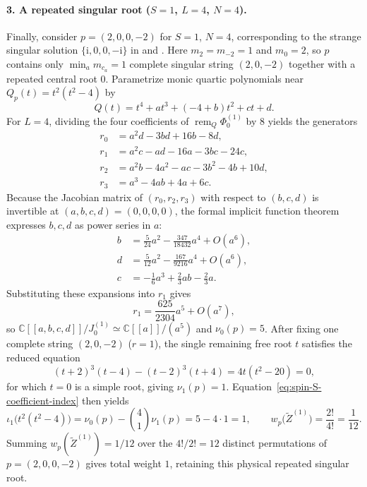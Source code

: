 \documentclass[11pt]{article}
\theoremstyle{definition}
\newcommand{\ii}{\mathrm{i}}
\newcommand{\C}{\mathbb{C}}
\begin{document}
\paragraph{3. A repeated singular root ($S=1$, $L=4$, $N=4$).}
Finally, consider $p=(2,0,0,-2)$ for $S=1$, $N=4$, corresponding to the strange singular solution
$\{\ii,0,0,-\ii\}$ in \cite[Section~B.2.1 and Table~2]{HNS2014} and \cite[Section~4.1, Example~3]{HJJ2024}. Here $m_2=m_{-2}=1$ and $m_0=2$, so $p$ contains only $\min_a m_{c_a}=1$ complete singular string $(2,0,-2)$ together with a repeated central root $0$. Parametrize monic quartic polynomials near $Q_p(t)=t^2(t^2-4)$ by
\[
 Q(t)=t^4+a t^3+(-4+b)t^2+ct+d.
\]
For $L=4$, dividing the four coefficients of $\operatorname{rem}_Q\Phi_0^{(1)}$ by $8$ yields the generators
\[
 \begin{aligned}
 r_0&=a^2d-3bd+16b-8d,\\
 r_1&=a^2c-ad-16a-3bc-24c,\\
 r_2&=a^2b-4a^2-ac-3b^2-4b+10d,\\
 r_3&=a^3-4ab+4a+6c.
 \end{aligned}
\]
Because the Jacobian matrix of $(r_0,r_2,r_3)$ with respect to $(b,c,d)$ is invertible
at $(a,b,c,d)=(0,0,0,0)$, the formal implicit function theorem expresses $b,c,d$ as power
series in $a$:
\[
 \begin{aligned}
 b&=\frac{5}{24}a^2-\frac{347}{18432}a^4+O(a^6),\\
 d&=\frac{5}{12}a^2-\frac{167}{9216}a^4+O(a^6),\\
 c&=-\frac{1}{6}a^3+\frac{2}{3}ab-\frac{2}{3}a.
 \end{aligned}
\]
Substituting these expansions into $r_1$ gives
\[
 r_1=\frac{625}{2304}a^5+O(a^7),
\]
so $\C[[a,b,c,d]]/J_0^{(1)}\simeq\C[[a]]/(a^5)$ and $\nu_0(p)=5$.
After fixing one complete string $(2,0,-2)$ ($r=1$), the single remaining free root $t$ satisfies the reduced equation
\[
 (t+2)^3(t-4)-(t-2)^3(t+4)=4t(t^2-20)=0,
\]
for which $t=0$ is a simple root, giving $\nu_1(p)=1$. Equation~\eqref{eq:spin-S-coefficient-index} then yields
\[
 \iota_1\bigl(t^2(t^2-4)\bigr)=\nu_0(p)-\binom{4}{1}\nu_1(p)=5-4\cdot 1=1,
 \qquad w_p\bigl(\tilde{Z}^{(1)}\bigr)=\frac{2!}{4!}=\frac{1}{12}.
\]
Summing $w_p(\tilde{Z}^{(1)})=1/12$ over the $4!/2!=12$ distinct permutations of $p=(2,0,0,-2)$ gives total weight $1$, retaining this physical repeated singular root.
\end{document}

